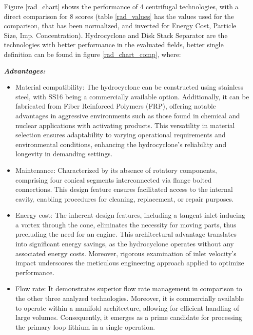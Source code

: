 \noindent Figure \ref{rad_chart} shows the performance of 4 centrifugal technologies, with a direct comparison for 8 scores (table \ref{rad_values} has the values used for the comparison, that has been normalized, and inverted for Energy Cost, Particle Size, Imp. Concentration). Hydrocyclone and Disk Stack Separator are the technologies with better performance in the evaluated fields, better single definition can be found in figure \ref{rad_chart_comp}, where:

 \begin{tcolorbox}[colback=blue!5!white,enhanced,breakable,colframe=blue!75!black,title=Hydrocyclone]
 	
 	\textbf{\textit{Advantages:}}
 	\begin{itemize}
 		\item Material compatibility: The hydrocyclone can be constructed using stainless steel, with SS16 being a commercially available option. Additionally, it can be fabricated from Fiber Reinforced Polymers (FRP), offering notable advantages in aggressive environments such as those found in chemical and nuclear applications with activating products. This versatility in material selection ensures adaptability to varying operational requirements and environmental conditions, enhancing the hydrocyclone's reliability and longevity in demanding settings.
 		\item Maintenance: Characterized by its absence of rotatory components, comprising four conical segments interconnected via flange bolted connections. This design feature ensures facilitated access to the internal cavity, enabling procedures for cleaning, replacement, or repair purposes.
 		\item Energy cost: The inherent design features, including a tangent inlet inducing a vortex through the cone, eliminates the necessity for moving parts, thus precluding the need for an engine. This architectural advantage translates into significant energy savings, as the hydrocyclone operates without any associated energy costs. Moreover, rigorous examination of inlet velocity's impact underscores the meticulous engineering approach applied to optimize performance.
 		\item Flow rate: It demonstrates superior flow rate management in comparison to the other three analyzed technologies. Moreover, it is commercially available to operate within a manifold architecture, allowing for efficient handling of large volumes. Consequently, it emerges as a prime candidate for processing the primary loop lithium in a single operation.
 	\end{itemize}
 	

\end{tcolorbox}
